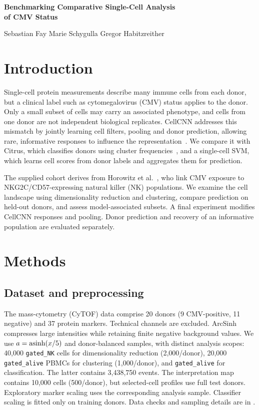 \documentclass[11pt,a4paper]{article}
\begin{document}
\begin{center}
{\Large\bfseries Benchmarking Comparative Single-Cell Analysis\\of CMV Status\par}
\vspace{3pt}
Sebastian Fay \quad Marie Schygulla \quad Gregor Habitzreither
\end{center}
\vspace{-6pt}

\section{Introduction}
Single-cell protein measurements describe many immune cells from each donor, but a clinical label such as cytomegalovirus (CMV) status applies to the donor. Only a small subset of cells may carry an associated phenotype, and cells from one donor are not independent biological replicates. CellCNN addresses this mismatch by jointly learning cell filters, pooling and donor prediction, allowing rare, informative responses to influence the representation~\cite{cellcnn}. We compare it with Citrus, which classifies donors using cluster frequencies~\cite{citrus}, and a single-cell SVM, which learns cell scores from donor labels and aggregates them for prediction.

The supplied cohort derives from Horowitz et al.~\cite{horowitz}, who link CMV exposure to NKG2C/CD57-expressing natural killer (NK) populations. We examine the cell landscape using dimensionality reduction and clustering, compare prediction on held-out donors, and assess model-associated subsets. A final experiment modifies CellCNN responses and pooling. Donor prediction and recovery of an informative population are evaluated separately.

\section{Methods}
\subsection{Dataset and preprocessing}
The mass-cytometry (CyTOF) data comprise 20 donors (9 CMV-positive, 11 negative) and 37 protein markers. Technical channels are excluded. ArcSinh compresses large intensities while retaining finite negative background values. We use $a=\operatorname{asinh}(x/5)$ and donor-balanced samples, with distinct analysis scopes: 40,000 \texttt{gated\_NK} cells for dimensionality reduction (2,000/donor), 20,000 \texttt{gated\_alive} PBMCs for clustering (1,000/donor), and \texttt{gated\_alive} for classification. The latter contains 3,438,750 events. The interpretation map contains 10,000 cells (500/donor), but selected-cell profiles use full test donors. Exploratory marker scaling uses the corresponding analysis sample. Classifier scaling is fitted only on training donors. Data checks and sampling details are in .
\end{document}
